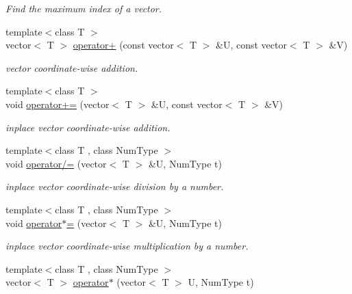 \begin{DoxyCompactItemize}
\begin{DoxyCompactList}\small\item\em Find the maximum index of a vector. \end{DoxyCompactList}\item 
\hypertarget{namespacedscr_aa8a19b74cd2eb1f7388df7fe10f61be1}{{\footnotesize template$<$class T $>$ }\\vector$<$ T $>$ \hyperlink{namespacedscr_aa8a19b74cd2eb1f7388df7fe10f61be1}{operator+} (const vector$<$ T $>$ \&U, const vector$<$ T $>$ \&V)}\label{namespacedscr_aa8a19b74cd2eb1f7388df7fe10f61be1}

\begin{DoxyCompactList}\small\item\em vector coordinate-\/wise addition. \end{DoxyCompactList}\item 
\hypertarget{namespacedscr_aa27f37543a31cc118635fd58fbdbb237}{{\footnotesize template$<$class T $>$ }\\void \hyperlink{namespacedscr_aa27f37543a31cc118635fd58fbdbb237}{operator+=} (vector$<$ T $>$ \&U, const vector$<$ T $>$ \&V)}\label{namespacedscr_aa27f37543a31cc118635fd58fbdbb237}

\begin{DoxyCompactList}\small\item\em inplace vector coordinate-\/wise addition. \end{DoxyCompactList}\item 
\hypertarget{namespacedscr_aab688a0190dfb8facaad935e7d38701f}{{\footnotesize template$<$class T , class Num\-Type $>$ }\\void \hyperlink{namespacedscr_aab688a0190dfb8facaad935e7d38701f}{operator/=} (vector$<$ T $>$ \&U, Num\-Type t)}\label{namespacedscr_aab688a0190dfb8facaad935e7d38701f}

\begin{DoxyCompactList}\small\item\em inplace vector coordinate-\/wise division by a number. \end{DoxyCompactList}\item 
\hypertarget{namespacedscr_a87be4f136e1bb7e7758c8fac4786e89b}{{\footnotesize template$<$class T , class Num\-Type $>$ }\\void \hyperlink{namespacedscr_a87be4f136e1bb7e7758c8fac4786e89b}{operator$\ast$=} (vector$<$ T $>$ \&U, Num\-Type t)}\label{namespacedscr_a87be4f136e1bb7e7758c8fac4786e89b}

\begin{DoxyCompactList}\small\item\em inplace vector coordinate-\/wise multiplication by a number. \end{DoxyCompactList}\item 
\hypertarget{namespacedscr_a020debab1c1e4d841375c272822810ed}{{\footnotesize template$<$class T , class Num\-Type $>$ }\\vector$<$ T $>$ \hyperlink{namespacedscr_a020debab1c1e4d841375c272822810ed}{operator$\ast$} (vector$<$ T $>$ U, Num\-Type t)}\label{namespacedscr_a020debab1c1e4d841375c272822810ed}


\end{DoxyCompactItemize}
